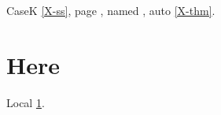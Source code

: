 \documentclass{article}
\begin{document}
CaseK \ref{X-ss}, page \pageref{X-front}, named ,
auto \autoref{X-thm}.

\section{Here}\label{here}
Local \ref{here}.
\end{document}
